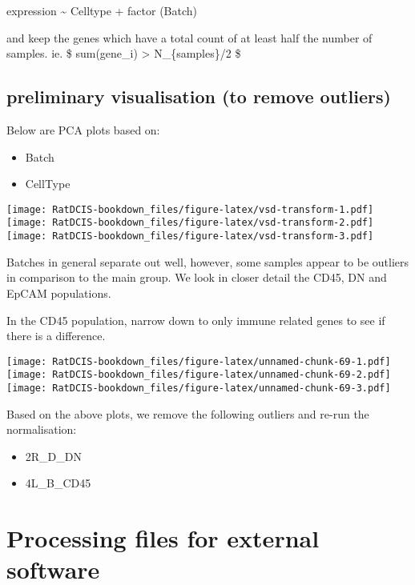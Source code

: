 \documentclass[
]{book}
\providecommand{\tightlist}{%
  \setlength{\itemsep}{0pt}\setlength{\parskip}{0pt}}
\begin{document}
expression \textasciitilde{} Celltype + factor (Batch)

and keep the genes which have a total count of at least half the number of samples. ie.
\$ sum(gene\_i) \textgreater{} N\_\{samples\}/2 \$

\hypertarget{preliminary-visualisation-to-remove-outliers}{%
\subsection{preliminary visualisation (to remove outliers)}\label{preliminary-visualisation-to-remove-outliers}}

Below are PCA plots based on:

\begin{itemize}
\tightlist
\item
  Batch
\item
  CellType
\end{itemize}

\texttt{[image: RatDCIS-bookdown\_files/figure-latex/vsd-transform-1.pdf]} \texttt{[image: RatDCIS-bookdown\_files/figure-latex/vsd-transform-2.pdf]} \texttt{[image: RatDCIS-bookdown\_files/figure-latex/vsd-transform-3.pdf]}

Batches in general separate out well, however, some samples appear to be outliers in comparison to the main group. We look in closer detail the CD45, DN and EpCAM populations.

In the CD45 population, narrow down to only immune related genes to see if there is a difference.

\texttt{[image: RatDCIS-bookdown\_files/figure-latex/unnamed-chunk-69-1.pdf]} \texttt{[image: RatDCIS-bookdown\_files/figure-latex/unnamed-chunk-69-2.pdf]} \texttt{[image: RatDCIS-bookdown\_files/figure-latex/unnamed-chunk-69-3.pdf]}

Based on the above plots, we remove the following outliers and re-run the normalisation:

\begin{itemize}
\tightlist
\item
  2R\_D\_DN
\item
  4L\_B\_CD45
\end{itemize}

\hypertarget{processing-files-for-external-software}{%
\section{Processing files for external software}\label{processing-files-for-external-software}}
\end{document}
